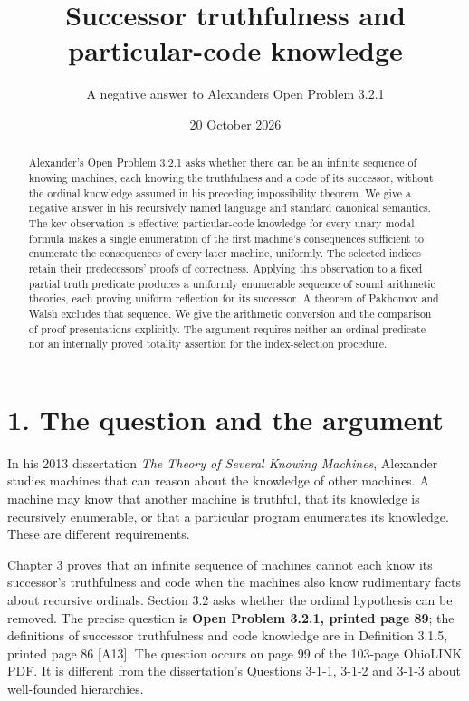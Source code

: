 \documentclass[
  11pt,
  letterpaper,
]{article}
\title{Successor truthfulness and particular-code knowledge}
\subtitle{A negative answer to Alexander\textquotesingle s Open Problem
3.2.1}
\author{}
\date{20 October 2026}
\begin{document}
\maketitle
\begin{abstract}
Alexander's Open Problem 3.2.1 asks whether there can be an infinite
sequence of knowing machines, each knowing the truthfulness and a code
of its successor, without the ordinal knowledge assumed in his preceding
impossibility theorem. We give a negative answer in his recursively
named language and standard canonical semantics. The key observation is
effective: particular-code knowledge for every unary modal formula makes
a single enumeration of the first machine's consequences sufficient to
enumerate the consequences of every later machine, uniformly. The
selected indices retain their predecessors' proofs of correctness.
Applying this observation to a fixed partial truth predicate produces a
uniformly enumerable sequence of sound arithmetic theories, each proving
uniform reflection for its successor. A theorem of Pakhomov and Walsh
excludes that sequence. We give the arithmetic conversion and the
comparison of proof presentations explicitly. The argument requires
neither an ordinal predicate nor an internally proved totality assertion
for the index-selection procedure.
\end{abstract}

\section{1. The question and the
argument}\label{the-question-and-the-argument}

In his 2013 dissertation \emph{The Theory of Several Knowing Machines},
Alexander studies machines that can reason about the knowledge of other
machines. A machine may know that another machine is truthful, that its
knowledge is recursively enumerable, or that a particular program
enumerates its knowledge. These are different requirements.

Chapter 3 proves that an infinite sequence of machines cannot each know
its successor's truthfulness and code when the machines also know
rudimentary facts about recursive ordinals. Section 3.2 asks whether the
ordinal hypothesis can be removed. The precise question is \textbf{Open
Problem 3.2.1, printed page 89}; the definitions of successor
truthfulness and code knowledge are in Definition 3.1.5, printed page 86
{[}A13{]}. The question occurs on page 99 of the 103-page OhioLINK PDF.
It is different from the dissertation's Questions 3-1-1, 3-1-2 and 3-1-3
about well-founded hierarchies.
\end{document}
